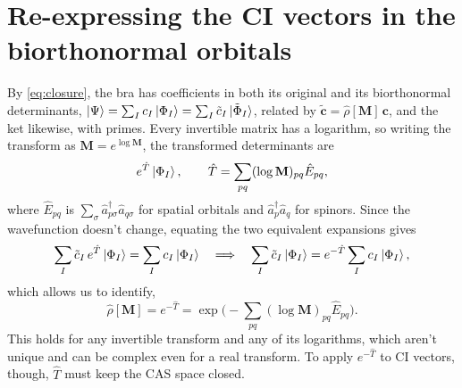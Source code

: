 \documentclass[aip,jcp,preprint]{revtex4-1}
\newcommand{\bvec}[1]{\mathbf{#1}}
\begin{document}
\section{Re-expressing the CI vectors in the biorthonormal orbitals}
\label{sec:transform}

By \cref{eq:closure}, the bra has coefficients in both its original and its biorthonormal determinants, $\ket{\Psi} = \sum_I c_I\ket{\Phi_I} = \sum_I \tilde{c}_I\ket{\tilde{\Phi}_I}$, related by $\tilde{\bvec{c}} = \hat{\rho}[\bvec{M}]\,\bvec{c}$, and the ket likewise, with primes.
Every invertible matrix has a logarithm, so writing the transform as $\bvec{M} = e^{\log\bvec{M}}$, the transformed determinants are
\begin{equation}
 e^{\hat{T}}\ket{\Phi_I},
 \qquad
 \hat{T} = \sum_{pq} (\log\bvec{M})_{pq}\hat{E}_{pq},
 \label{eq:det-exp}
\end{equation}
where $\hat{E}_{pq}$ is $\sum_\sigma \hat{a}^\dagger_{p\sigma}\hat{a}_{q\sigma}$ for spatial orbitals and $\hat{a}^\dagger_p\hat{a}_q$ for spinors.\cite{MoshinskySeligman1971,Malmqvist1986}
Since the wavefunction doesn't change, equating the two equivalent expansions gives
\begin{equation}
 \sum_I \tilde{c}_I\, e^{\hat{T}}\ket{\Phi_I} = \sum_I c_I\ket{\Phi_I}
 \quad\Longrightarrow\quad
 \sum_I \tilde{c}_I\ket{\Phi_I} = e^{-\hat{T}}\sum_I c_I\ket{\Phi_I},
\end{equation}
which allows us to identify,
\begin{equation}
 \hat{\rho}[\bvec{M}] = e^{-\hat{T}}
 = \exp\Big(-\sum_{pq}(\log\bvec{M})_{pq}\hat{E}_{pq}\Big).
 \label{eq:rho-exp}
\end{equation}
This holds for any invertible transform and any of its logarithms, which aren't unique and can be complex even for a real transform.
To apply $e^{-\hat{T}}$ to CI vectors, though, $\hat{T}$ must keep the CAS space closed.
\end{document}
